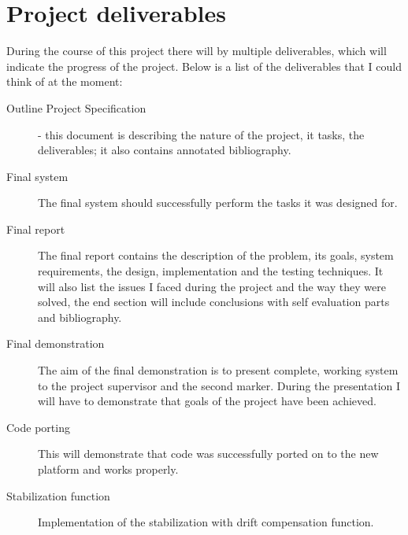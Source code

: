 \documentclass[11pt,fleqn,twoside]{article}
\begin{document}
\section{Project deliverables}
During the course of this project there will by multiple deliverables, which will indicate the progress of the project. Below is a list of the deliverables that I could think of at the moment:  

\begin{description}
   \item[Outline Project Specification] - this document is describing the nature of the project, it tasks, the deliverables; it also contains annotated bibliography.
   \item[Final system] The final system should successfully perform the tasks it was designed for. 
   \item[Final report] The final report contains the description of the problem, its goals, system requirements, the design, implementation and the testing techniques. It will also list the issues I faced during the project and the way they were solved, the end section will include conclusions with self evaluation parts and bibliography.  
   \item[Final demonstration] The aim of the final demonstration is to present complete, working system to the project supervisor and the second marker. During the presentation I will have to demonstrate that goals of the project have been achieved.
   \item[Code porting] This will demonstrate that code was successfully ported on to the new platform and works properly. 
   \item[Stabilization function] Implementation of the stabilization with drift compensation function.
\end{description}

\nocite{*} %

\newpage
{} 

%

\renewcommand{\refname}{Annotated Bibliography}  %
\end{document}
